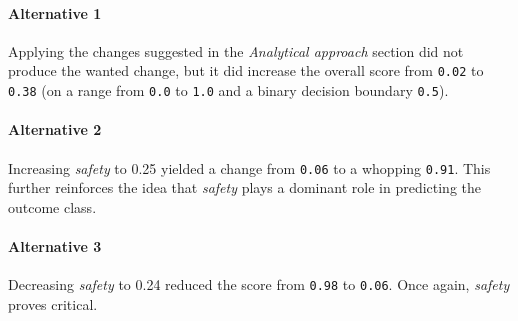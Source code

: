 \documentclass[../main.tex]{subfiles}
\begin{document}
\paragraph{Alternative 1} Applying the changes suggested in the
\emph{Analytical approach} section did not produce the wanted change, but it
did increase the overall score from \verb`0.02` to \verb`0.38` (on a range from
\verb`0.0` to \verb`1.0` and a binary decision boundary \verb`0.5`).
\paragraph{Alternative 2} Increasing \emph{safety} to 0.25 yielded a change
from \verb`0.06` to a whopping \verb`0.91`. This further reinforces the idea
that \emph{safety} plays a dominant role in predicting the outcome class.
\paragraph{Alternative 3} Decreasing \emph{safety} to 0.24 reduced the score
from \verb`0.98` to \verb`0.06`. Once again, \emph{safety} proves critical.
\end{document}
